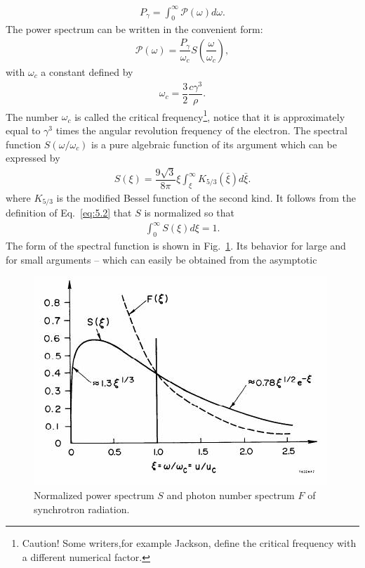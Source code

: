 \begin{align}
	P_\gamma = \int_0^{\infty} \mathscr{P}(\omega) d\omega.
\end{align}
The power spectrum can be written in the convenient form:
\begin{align} \label{eq:5.2}
	\mathscr{P}(\omega) = \dfrac{P_\gamma}{\omega_c} S\left( \dfrac{\omega}{\omega_c} \right),
\end{align}
with $\omega_c$ a constant defined by
\begin{align}
	\omega_c = \dfrac{3}{2} \dfrac{c \gamma^3}{\rho}.
\end{align}
The number $\omega_c$ is called the critical frequency\footnote{Caution!
 Some writers,for example Jackson, define the critical frequency with a different numerical factor.}, notice that it is approximately equal to $\gamma^3$ times the angular revolution
 frequency of the electron. The spectral function $S(\omega/\omega_c)$ is a pure algebraic
 function of its argument which can be expressed by
\begin{align}
	S(\xi) = \dfrac{9 \sqrt{3}}{8\pi} \xi \int_\xi^{\infty} K_{5/3} (\bar{\xi}) d\bar{\xi}.
\end{align}
where $K_{5/3}$ is the modified Bessel function of the second kind. It follows from the definition of Eq.~\eqref{eq:5.2} that $S$ is normalized so that
\begin{align}
	\int_0^{\infty} S(\xi) d\xi = 1.
\end{align}
The form of the spectral function is shown in Fig.~\ref{fig:fig42}. Its behavior for large and for small arguments -- which can easily be obtained from the asymptotic
\begin{figure}[!htb]
	\centering
	\includegraphics[width=0.8\linewidth]{./Figuras/fig42.jpeg}
	\caption{Normalized power spectrum $S$ and photon number spectrum $F$ of synchrotron radiation.}
	\label{fig:fig42}
\end{figure}
